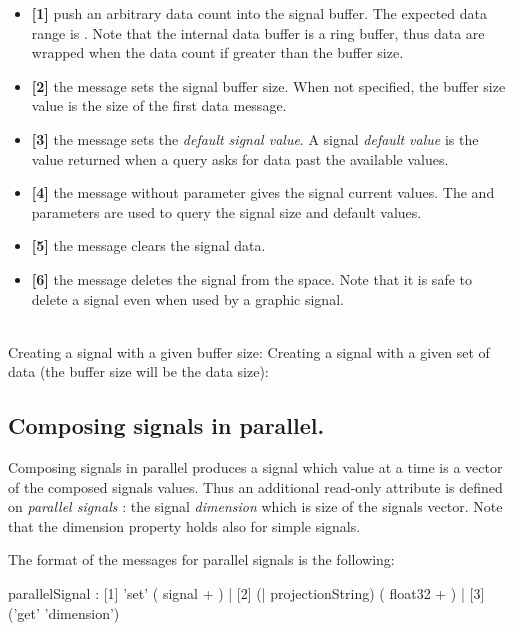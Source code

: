\documentclass[a4paper,twoside]{report}
\newcommand{\subsublevel}[1]	{\subsection{#1}}
\begin{document}
\begin{itemize}
\item \textbf{[1]} push an arbitrary data count into the signal buffer. The expected data range is . Note that the internal data buffer is a ring buffer, thus data are wrapped when the data count if greater than the buffer size. 
\item \textbf{[2]} the  message sets the signal buffer size. When not specified, the buffer size value is the size of the first data message. 
\item \textbf{[3]} the  message sets the \emph{default signal value}. A signal \emph{default value} is the value returned when a query asks for data past the available values.
\item \textbf{[4]} the  message without parameter gives the signal current values. The  and   parameters are used to query the signal size and default values.
\item \textbf{[5]} the  message clears the signal data. 
\item \textbf{[6]} the  message deletes the signal from the  space. Note that it is safe to delete a signal even when used by a graphic signal. 
\end{itemize}

\example \\
Creating a signal with a given buffer size:
Creating a signal with a given set of data (the buffer size will be the data size):


\subsublevel{Composing signals in parallel.}
\label{parcomp}
Composing signals in parallel produces a signal which value at a time  is a vector of the composed signals values. Thus an additional read-only attribute is defined on \emph{parallel signals} : the signal \emph{dimension} which is size of the signals vector. Note that the dimension property holds also for simple signals.

The format of the messages for parallel signals is the following:


\begin{rail}
parallelSignal :  
		  [1] 'set' ( signal + )
		| [2] (| projectionString) ( float32 + )
		| [3] ('get' 'dimension') 
\end{rail}
\end{document}
